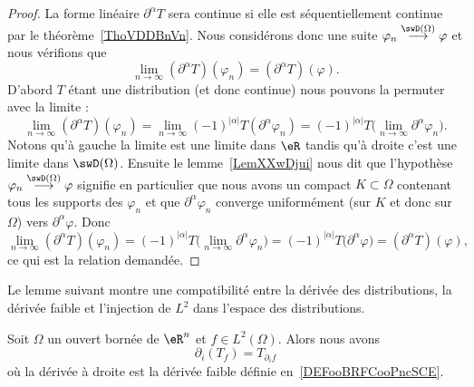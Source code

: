 \begin{proof}
    La forme linéaire \( \partial^{\alpha}T\) sera continue si elle est séquentiellement continue par le théorème~\ref{ThoVDDBnVn}. Nous considérons donc une suite \( \varphi_n\stackrel{\swD(\Omega)}{\longrightarrow}\varphi\) et nous vérifions que
    \begin{equation}
        \lim_{n\to \infty} (\partial^{\alpha}T)(\varphi_n)=(\partial^{\alpha}T)(\varphi).
    \end{equation}
    D'abord \( T\) étant une distribution (et donc continue) nous pouvons la permuter avec la limite :
    \begin{equation}
        \lim_{n\to \infty} (\partial^{\alpha}T)(\varphi_n)=\lim_{n\to \infty} (-1)^{| \alpha |}T(\partial^{\alpha}\varphi_n)=(-1)^{| \alpha |}T\big( \lim_{n\to \infty} \partial^{\alpha}\varphi_n \big).
    \end{equation}
    Notons qu'à gauche la limite est une limite dans \( \eR\) tandis qu'à droite c'est une limite dans \( \swD(\Omega)\). Ensuite le lemme~\ref{LemXXwDjui} nous dit que l'hypothèse \( \varphi_n\stackrel{\swD(\Omega)}{\longrightarrow}\varphi\) signifie en particulier que nous avons un compact \( K\subset\Omega\) contenant tous les supports des \( \varphi_n\) et que \( \partial^{\alpha}\varphi_n\) converge uniformément (sur \( K\) et donc sur \( \Omega\)) vers \( \partial^{\alpha}\varphi\). Donc
    \begin{equation}
        \lim_{n\to \infty} (\partial^{\alpha}T)(\varphi_n)=(-1)^{| \alpha |}T\big( \lim_{n\to \infty} \partial^{\alpha}\varphi_n \big)=(-1)^{| \alpha |}T\big( \partial^{\alpha}\varphi \big)=(\partial^{\alpha}T)(\varphi),
    \end{equation}
    ce qui est la relation demandée.
\end{proof}

Le lemme suivant montre une compatibilité entre la dérivée des distributions, la dérivée faible et l'injection de \( L^2\) dans l'espace des distributions.

\begin{lemma}       \label{LEMooQRUOooWVjCAV}
    Soit \( \Omega\) un ouvert bornée de \( \eR^n\) et \( f\in L^2(\Omega)\). Alors nous avons
    \begin{equation}
        \partial_i(T_f)=T_{\partial_if}
    \end{equation}
    où la dérivée à droite est la dérivée faible définie en~\ref{DEFooBRFCooPncSCE}.
\end{lemma}

